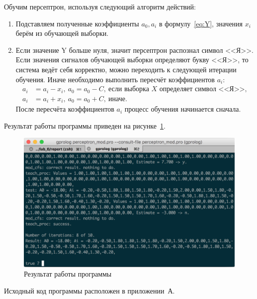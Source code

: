 Обучим персептрон, используя следующий алгоритм действий:
\begin{enumerate}
  \item Подставляем полученные коэффициенты $a_0, a_i$ в формулу~\eqref{eq:Y},
  значения $x_i$ берём из обучающей выборки.
  \item Если значение Y больше нуля, значит персептрон распознал символ <<Я>>.
  Если значения сигналов обучающей выборки определяют букву <<Я>>,
  то система ведёт себя корректно, можно переходить к следующей итерации обучения. 
  Иначе необходимо выполнить пересчёт коэффициентов $a_i$:
  \begin{align*}
    a_i &= a_i - x_i, \: a_0 = a_0 - C, \: \text{если выборка } X \text{ определяет символ <<Я>>}, \\
    a_i &= a_i + x_i, \: a_0 = a_0 + C, \: \text{иначе}.
  \end{align*}
  После пересчёта коэффициентов $a_i$ процесс обучения начинается сначала.
\end{enumerate}

Результат работы программы приведен на рисунке~\ref{fig:results}.

\begin{figure}[h!]
  \centering
  \includegraphics[width=130mm]{img/results}
  \caption{Результат работы программы}
  \label{fig:results}
\end{figure}

Исходный код программы расположен в приложении~А.

\newpage